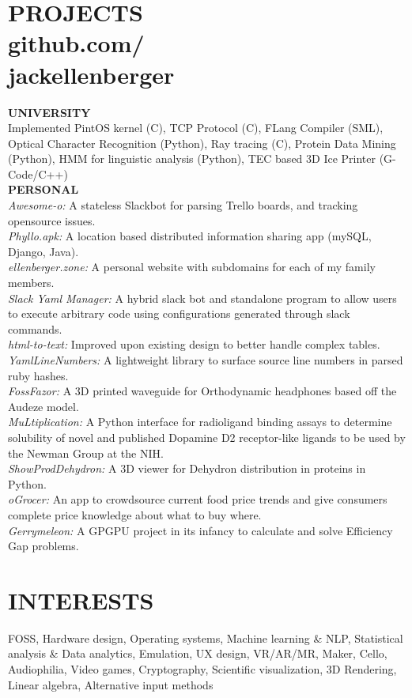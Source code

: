 \documentclass[line,margin]{res}
\begin{document}
\begin{resume}
\section{PROJECTS\\ \textnormal{github.com/\\jackellenberger}}
\textbf{UNIVERSITY}\\
Implemented PintOS kernel (C), TCP Protocol (C), FLang Compiler (SML), Optical Character Recognition (Python), Ray tracing (C), Protein Data Mining (Python), HMM for linguistic analysis (Python), TEC based 3D Ice Printer (G-Code/C++)\\
\textbf{PERSONAL}\\
\textit{Awesome-o:} A stateless Slackbot for parsing Trello boards, and tracking opensource issues.\\ 
\textit{Phyllo.apk:} A location based distributed information sharing app (mySQL, Django, Java).\\ 
\textit{ellenberger.zone:} A personal website with subdomains for each of my family members.\\
\textit{Slack Yaml Manager:} A hybrid slack bot and standalone program to allow users to execute arbitrary code using configurations generated through slack commands.\\
\textit{html-to-text:} Improved upon existing design to better handle complex tables.\\
\textit{YamlLineNumbers:} A lightweight library to surface source line numbers in parsed ruby hashes.\\
\textit{FossFazor:} A 3D printed waveguide for Orthodynamic headphones based off the Audeze model.\\ 
\textit{MuLtiplication:} A Python interface for radioligand binding assays to determine solubility of novel and published Dopamine D2 receptor-like ligands to be used by the Newman Group at the NIH.\\
\textit{ShowProdDehydron:} A 3D viewer for Dehydron distribution in proteins in Python.\\
\textit{oGrocer:} An app to crowdsource current food price trends and give consumers complete price knowledge about what to buy where.\\
\textit{Gerrymeleon:} A GPGPU project in its infancy to calculate and solve Efficiency Gap problems.

\section{INTERESTS} 
FOSS, Hardware design, Operating systems, Machine learning \& NLP, Statistical analysis \& Data analytics, Emulation, UX design, VR/AR/MR, Maker, Cello, Audiophilia, Video games, Cryptography, Scientific visualization, 3D Rendering, Linear algebra, Alternative input methods
\end{resume}
\end{document}
